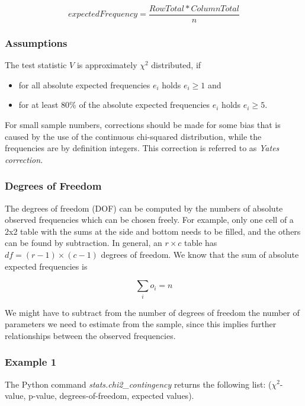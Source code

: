 \begin{equation}
  expectedFrequency = \frac{RowTotal * ColumnTotal}{n}
\end{equation}


\subsubsection{Assumptions}
The test statistic $V$ is approximately $\chi^2$ distributed, if

\begin{itemize}
  \item for all absolute expected frequencies $e_i$ holds $e_i \geq 1$ and
  \item for at least 80\% of the absolute expected frequencies $e_i$ holds $e_i \geq 5$.
\end{itemize}

For small sample numbers, corrections should be made for some bias that is caused by the use of the continuous chi-squared distribution, while the frequencies are by definition integers. This correction is referred to as \emph{Yates correction}.

\subsubsection{Degrees of Freedom}
The degrees of freedom (DOF) can be computed by the numbers of absolute observed frequencies which can be chosen freely. For example, only one cell of a 2x2 table with the sums at the side and bottom needs to be filled, and the others can be found by subtraction. In general, an $r \times c$ table has $df=(r-1)\times(c-1)$ degrees of freedom.
 We know that the sum of absolute expected frequencies is

\begin{equation}
  \sum_i o_i = n
\end{equation}

We might have to subtract from the number of degrees of freedom the number of parameters we need to estimate from the sample, since this implies further relationships between the observed frequencies.

\subsubsection{Example 1}

The Python command \emph{stats.chi2\_contingency} returns the following list: ($\chi^2$-value, p-value, degrees-of-freedom, expected values).

